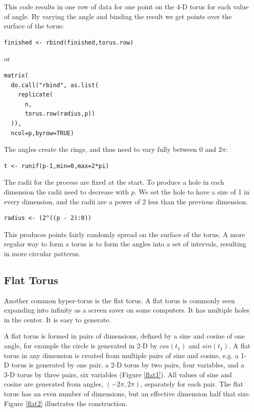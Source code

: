 \documentclass[a4paper]{report}
\begin{document}
\begin{article}
This code results in one row of data for one point on the 4-D torus
for each value of angle.  By varying the angle and binding the result
we get points over the surface of the torus:

\begin{verbatim}
finished <- rbind(finished,torus.row)
\end{verbatim}

or

\begin{verbatim}
matrix(
  do.call("rbind", as.list(
    replicate(
      n, 
      torus.row(radius,p))
  )),
  ncol=p,byrow=TRUE)
\end{verbatim}

The angles create the rings, and thus need to vary fully between 0 and
$2\pi$:

\begin{verbatim}
t <- runif(p-1,min=0,max=2*pi)
\end{verbatim}

The radii for the process are fixed at the start.  To produce a hole
in each dimension the radii need to decrease with $p$.  We set the
hole to have a size of 1 in every dimension, and the radii are a power
of 2 less than the previous dimension.

\begin{verbatim}
radius <- (2^((p - 2):0))
\end{verbatim}

\noindent This produces points fairly randomly spread on the surface of
the torus.  A more regular way to form a torus is to form the angles
into a set of intervals, resulting in more circular patterns.

\subsection{Flat Torus}

Another common hyper-torus is the flat torus. A flat torus is commonly
seen expanding into infinity as a screen saver on some computers. It
has multiple holes in the center. It is easy to generate.

A flat torus is formed in pairs of dimensions, defined by a sine and
cosine of one angle, for example the circle is generated in 2-D by
$cos(t_1)$ and $sin(t_1)$.  A flat torus in any dimension is created
from multiple pairs of sine and cosine, e.g. a 1-D torus is generated by
one pair, a 2-D torus by two pairs, four variables, and a 3-D torus by
three pairs, six variables (Figure \ref{flat1}).  All values of sine
and cosine are generated from angles, $(-2\pi, 2\pi)$, separately for
each pair.  The flat torus has an even number of dimensions, but an
effective dimension half that size. Figure \ref{flat2} illustrates the
construction.


\end{article}
\end{document}
